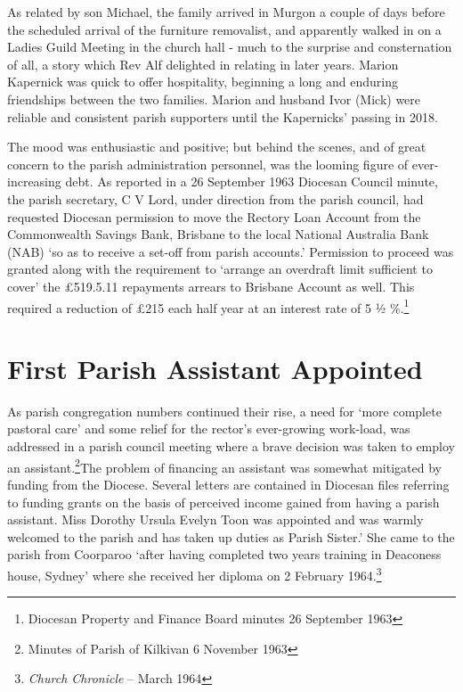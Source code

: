 As related by son Michael, the family arrived in Murgon a couple of days
before the scheduled arrival of the furniture removalist, and apparently
walked in on a Ladies Guild Meeting in the church hall - much to the
surprise and consternation of all, a story which Rev Alf delighted in
relating in later years. Marion Kapernick was quick to offer
hospitality, beginning a long and enduring friendships between the two
families. Marion and husband Ivor (Mick) were reliable and consistent
parish supporters until the Kapernicks' passing in 2018.

The mood was enthusiastic and positive; but behind the scenes, and of
great concern to the parish administration personnel, was the looming
figure of ever-increasing debt. As reported in a 26 September 1963
Diocesan Council minute, the parish secretary, C V Lord, under direction
from the parish council, had requested Diocesan permission to move the
Rectory Loan Account from the Commonwealth Savings Bank, Brisbane to the
local National Australia Bank (NAB) `so as to receive a set-off from
parish accounts.' Permission to proceed was granted along with the
requirement to `arrange an overdraft limit sufficient to cover' the
£519.5.11 repayments arrears to Brisbane Account as well. This required
a reduction of £215 each half year at an interest rate of 5 ½
\%.\footnote{Diocesan Property and Finance Board minutes 26 September
  1963}

\hypertarget{first-parish-assistant-appointed}{%
\section{First Parish Assistant
Appointed}\label{first-parish-assistant-appointed}}

As parish congregation numbers continued their rise, a need for `more
complete pastoral care' and some relief for the rector's ever-growing
work-load, was addressed in a parish council meeting where a brave
decision was taken to employ an assistant.\footnote{Minutes of Parish of
  Kilkivan 6 November 1963}The problem of financing an assistant was
somewhat mitigated by funding from the Diocese. Several letters are
contained in Diocesan files referring to funding grants on the basis of
perceived income gained from having a parish assistant. Miss Dorothy
Ursula Evelyn Toon was appointed and was warmly welcomed to the parish
and has taken up duties as Parish Sister.' She came to the parish from
Coorparoo `after having completed two years training in Deaconess house,
Sydney' where she received her diploma on 2 February 1964.\footnote{\emph{Church
  Chronicle} -- March 1964}

